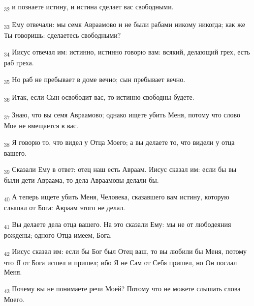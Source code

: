 \begin{tcolorbox}
\textsubscript{32} и познаете истину, и истина сделает вас свободными.
\end{tcolorbox}
\begin{tcolorbox}
\textsubscript{33} Ему отвечали: мы семя Авраамово и не были рабами никому никогда; как же Ты говоришь: сделаетесь свободными?
\end{tcolorbox}
\begin{tcolorbox}
\textsubscript{34} Иисус отвечал им: истинно, истинно говорю вам: всякий, делающий грех, есть раб греха.
\end{tcolorbox}
\begin{tcolorbox}
\textsubscript{35} Но раб не пребывает в доме вечно; сын пребывает вечно.
\end{tcolorbox}
\begin{tcolorbox}
\textsubscript{36} Итак, если Сын освободит вас, то истинно свободны будете.
\end{tcolorbox}
\begin{tcolorbox}
\textsubscript{37} Знаю, что вы семя Авраамово; однако ищете убить Меня, потому что слово Мое не вмещается в вас.
\end{tcolorbox}
\begin{tcolorbox}
\textsubscript{38} Я говорю то, что видел у Отца Моего; а вы делаете то, что видели у отца вашего.
\end{tcolorbox}
\begin{tcolorbox}
\textsubscript{39} Сказали Ему в ответ: отец наш есть Авраам. Иисус сказал им: если бы вы были дети Авраама, то дела Авраамовы делали бы.
\end{tcolorbox}
\begin{tcolorbox}
\textsubscript{40} А теперь ищете убить Меня, Человека, сказавшего вам истину, которую слышал от Бога: Авраам этого не делал.
\end{tcolorbox}
\begin{tcolorbox}
\textsubscript{41} Вы делаете дела отца вашего. На это сказали Ему: мы не от любодеяния рождены; одного Отца имеем, Бога.
\end{tcolorbox}
\begin{tcolorbox}
\textsubscript{42} Иисус сказал им: если бы Бог был Отец ваш, то вы любили бы Меня, потому что Я от Бога исшел и пришел; ибо Я не Сам от Себя пришел, но Он послал Меня.
\end{tcolorbox}
\begin{tcolorbox}
\textsubscript{43} Почему вы не понимаете речи Моей? Потому что не можете слышать слова Моего.
\end{tcolorbox}
